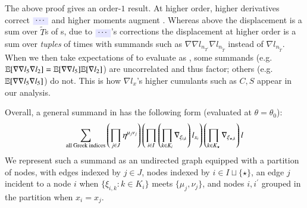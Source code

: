     The above proof gives an order-$1$ result.  %
At higher order, higher derivatives correct
${\translucent{moosky}{$\cdots$}}$
and higher
moments augment
.
%
%
Whereas above the displacement is a sum over $\tilde T$s of
s, due to ${\translucent{moosky}{$\cdots$}}$'s
corrections the displacement at higher order is a sum over \emph{tuples} of
times with summands such as $\nabla\nabla l_{n_{T^\prime}} \nabla l_{n_{\tilde
T}}$ instead of $\nabla l_{n_{\tilde T}}$.
%
When we then take expectations of  to evaluate 
 as  
,
some summands (e.g.\ $\mathbb{E}[\nabla\nabla l_{5}
\nabla l_{2}]=\mathbb{E}[\nabla\nabla l_{5}]
\mathbb{E}[\nabla l_{2}]$) are uncorrelated and thus factor; others (e.g.\ $\mathbb{E}[\nabla\nabla
l_{5} \nabla l_{5}]$) do not.  This is how $\nabla l_x$'s higher cumulants such
as $C, S$ appear in our analysis.
%
    \label{sect:diagrams-in-brief}

  Overall, a general summand in  has the following form (evaluated at $\theta=\theta_0$):
$$
    \sum_{\text{all Greek indices}} \left(\prod_{j\in J} \eta^{\mu_j\nu_j}\right)
    \left(\prod_{i\in I} \left(\prod_{k\in K_i} \nabla_{\xi_{i,k}}\right)
    l_{x_i}\right) \left(\prod_{k\in K_\star} \nabla_{\xi_{\star,k}}\right)
    l
$$
We represent such a summand
as an undirected graph equipped with a partition of nodes, with
edges indexed by $j\in J$, nodes
indexed by $i\in I\sqcup \{\star\}$, an edge $j$ incident
to a node $i$ when $\{\xi_{i,k}:k\in K_i\}$ meets
$\{\mu_j,\nu_j\}$, and nodes $i,i^\prime$ grouped in the partition when
$x_i=x_j$.





